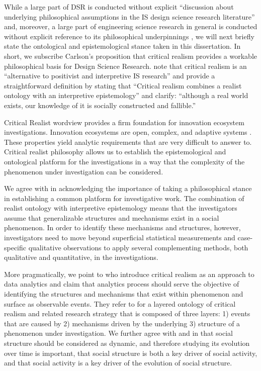 While a large part of DSR is conducted without explicit ``discussion about underlying philosophical assumptions in the IS design science research literature'' \cite{Carlsson2010DesignApproach} and, moreover, a large part of engineering science research in general is conducted without explicit reference to its philosophical underpinnings \citep{Naukkarinen2015WhatFinland}, we will next briefly state the ontological and epistemological stance taken in this dissertation. In short, we subscribe  Carlson's \citeyear{Carlsson2010DesignApproach} proposition that critical realism provides a workable philosophical basis for Design Science Research. \cite{Bygstad2011InAnalysis} note that critical realism is an ``alternative to positivist and interpretive IS research'' and provide a straightforward definition by stating that ``Critical realism combines a realist ontology  with an interpretive epistemology'' and clarify: ``although a real world exists, our knowledge of it is socially constructed and fallible.''

Critical Realist wordview provides a firm foundation for innovation ecosystem investigations. Innovation ecosystems are open, complex, and adaptive systems \citep{Thomas2012ModelingLiteratures}. These properties yield analytic requirements that are very difficult to answer to. Critical realist philosophy allows us to establish the epistemological and ontological platform for the investigations in a way that the complexity of the phenomenon under investigation can be considered. 

We agree with \cite{Dobson2001TheResearch} in acknowledging the importance of taking a philosophical stance in establishing a common platform for investigative work. The combination of realist ontology with interpretive epistemology \citep{Bygstad2011InAnalysis} means that the investigators assume that generalizable structures and mechanisms exist in a social phenomenon. In order to identify these mechanisms and structures, however, investigators need to move beyond superficial statistical measurements and case-specific qualitative observations to apply several complementing methods, both qualitative and quantitative, in the investigations. 

More pragmatically, we point to \cite{Bygstad2011InAnalysis} who introduce critical realism as an approach to data analytics and claim that analytics process should serve the objective of identifying the structures and mechanisms that exist within phenomenon and surface as observable events. They refer to \cite{Sayer2010MethodApproach} for a layered ontology of critical realism and related research strategy that is composed of three layers: 1) events that are caused by 2) mechanisms driven by the underlying 3) structure of a phenomenon under investigation. We further agree with \cite{Dobson2001TheResearch} and \cite{Archer1995RealistApproach} in that social structure should be considered as dynamic, and therefore studying its evolution over time is important, that social structure is both a key driver of social activity, and that social activity is a key driver of the evolution of social structure. 

